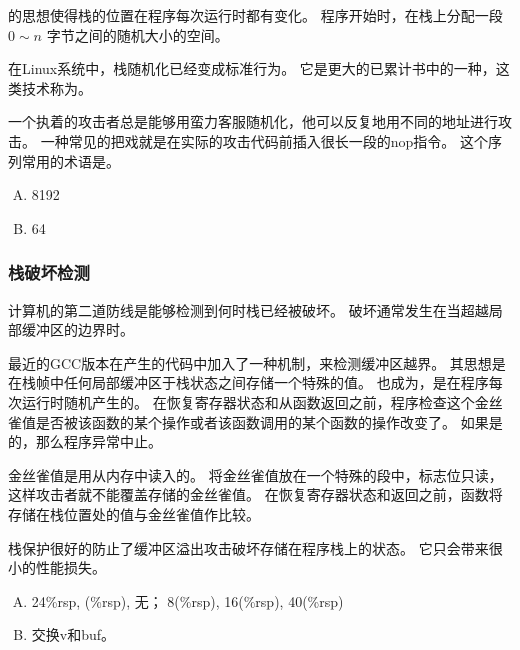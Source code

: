 {{{            的思想使得栈的位置在程序每次运行时都有变化。
            程序开始时，在栈上分配一段 $0 \sim n$ 字节之间的随机大小的空间。

            在Linux系统中，栈随机化已经变成标准行为。
            它是更大的已累计书中的一种，这类技术称为。

            一个执着的攻击者总是能够用蛮力客服随机化，他可以反复地用不同的地址进行攻击。
            一种常见的把戏就是在实际的攻击代码前插入很长一段的nop指令。
            这个序列常用的术语是。

            \begin{practicec}
                \begin{enumerate}[A.]
                    \item 8192
                    \item 64
                \end{enumerate}
            \end{practicec}
        }

        \subsubsection{栈破坏检测}
        {
            计算机的第二道防线是能够检测到何时栈已经被破坏。
            破坏通常发生在当超越局部缓冲区的边界时。

            最近的GCC版本在产生的代码中加入了一种机制，来检测缓冲区越界。
            其思想是在栈帧中任何局部缓冲区于栈状态之间存储一个特殊的值。
            也成为，是在程序每次运行时随机产生的。
            在恢复寄存器状态和从函数返回之前，程序检查这个金丝雀值是否被该函数的某个操作或者该函数调用的某个函数的操作改变了。
            如果是的，那么程序异常中止。

            金丝雀值是用从内存中读入的。
            将金丝雀值放在一个特殊的段中，标志位只读，这样攻击者就不能覆盖存储的金丝雀值。
            在恢复寄存器状态和返回之前，函数将存储在栈位置处的值与金丝雀值作比较。

            栈保护很好的防止了缓冲区溢出攻击破坏存储在程序栈上的状态。
            它只会带来很小的性能损失。

            \begin{practicec}
                \begin{enumerate}[A.]
                    \item
                    {
                        24\%rsp, (\%rsp), 无；
                        8(\%rsp), 16(\%rsp), 40(\%rsp)
                    }
                    \item
                    {
                        交换v和buf。
                    }
                \end{enumerate}
            \end{practicec}
        }

}}
